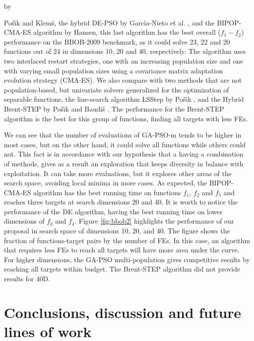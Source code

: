 \documentclass[runningheads]{llncs}
\begin{document}
by {Po{\v{s}}{\'\i}k and Klem{\v{s}},
the hybrid DE-PSO by Garc{\'\i}a-Nieto et
al. \cite{garcia2009noiseless},
and the BIPOP-CMA-ES algorithm \cite{hansen2009benchmarking} by Hansen, this last algorithm has the
best overall ($f_1-f_2$) performance on the BBOB-2009 benchmark,
as it  could solve 23, 22 and 20 functions out of 24 in dimensions 10, 20 and
40, respectively.  The algorithm uses two interlaced restart strategies, 
one with an increasing population size and one with varying small population sizes using
a covariance matrix adaptation evolution strategy (CMA-ES).
We also compare with two methods that are not population-based, but univariate
solvers generalized for the optimization of separable functions, the
line-search algorithm LSStep by Po{\v{s}}{\'\i}k \cite{povsik2009bbob}, and the Hybrid Brent-STEP by
Po{\v{s}}{\'\i}k and Baudi{\v{s}} \cite{povsik2015dimension}. The performance for the Brent-STEP algorithm
is the best for this group of functions, finding all targets with less FEs.

We can see that the number of evaluations of {\sf GA-PSO-m} tends to be higher
in most cases, but on the other hand, it could solve all functions
while others could not. This fact is in accordance with our hypothesis
that a having a combination of methods, gives as a result an 
exploration that keeps diversity in balance with exploitation.
It can take more evaluations, but it explores other areas of the search space, avoiding 
local minima in more cases.
As expected, the BIPOP-CMA-ES algorithm has the best running time on functions
$f_1$, $f_2$ and $f_5$ and reaches three targets at search dimensions 20 and 40.
It is worth to notice the performance of the DE algorithm, having the best
running time on lower dimensions of  $f_3$ and $f_4$.
Figure \ref{fig:bbob2} highlights the performance of our proposal in search
space of dimensions 10, 20, and 40. The figure shows the fraction of
functions-target pairs by the number of FEs. In this case, an algorithm that
requires less FEs to reach all targets will have more area under the curve. For
higher dimensions, the GA-PSO multi-population gives competitive results by
reaching all targets within budget. The Brent-STEP algorithm did not provide
results for 40D.

\section{Conclusions, discussion and future lines of work}
\label{conclusions}

}
\end{document}
